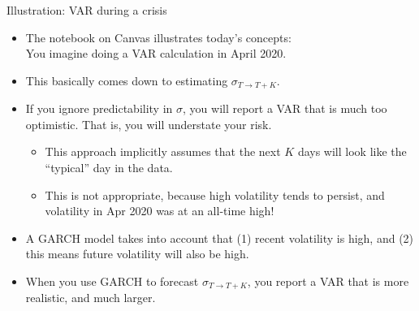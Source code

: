 \documentclass[t,12pt]{beamer}
\begin{document}
\begin{frame}[c]{Illustration: VAR during a crisis}
\begin{itemize}
\item The notebook on Canvas illustrates today's concepts:
\\ You imagine doing a VAR calculation in April 2020.
\item This basically comes down to estimating $\sigma_{T \to T+K}$.
\item If you ignore predictability in $\sigma$, you will report a VAR that is much too optimistic. That is, you will understate your risk. 
\begin{itemize}
\item This approach implicitly assumes that the next $K$ days will look like the ``typical'' day in the data.
\item This is not appropriate, because high volatility tends to persist, and volatility in Apr 2020 was at an all-time high!
\end{itemize}
\item A GARCH model takes into account that (1) recent volatility is high, and (2) this means future volatility will also be high.
\item When you use GARCH to forecast $\sigma_{T \to T+K}$, you report a VAR that is more realistic, and much larger.
\end{itemize}
\end{frame}
\end{document}
